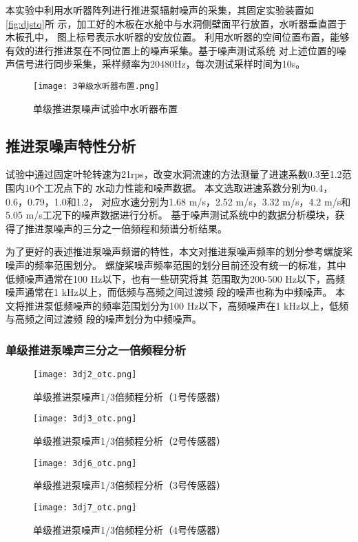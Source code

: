 本实验中利用水听器阵列进行推进泵辐射噪声的采集，其固定实验装置如\autoref{fig:djstq}所
示，加工好的木板在水舱中与水洞侧壁面平行放置，水听器垂直置于木板孔中，
图上标号表示水听器的安放位置。
利用水听器的空间位置布置，能够有效的进行推进泵在不同位置上的噪声采集。基于噪声测试系统
对上述位置的噪声信号进行同步采集，采样频率为20480Hz，每次测试采样时间为10s。
\begin{figure}[htbp]
    \centering
    \texttt{[image: 3单级水听器布置.png]}
    \caption{\label{fig:djstq}单级推进泵噪声试验中水听器布置}
\end{figure}
\subsection{推进泵噪声特性分析}
试验中通过固定叶轮转速为21rps，改变水洞流速的方法测量了进速系数0.3至1.2范围内10个工况点下的
水动力性能和噪声数据。
本文选取进速系数分别为0.4，0.6，0.79，1.0和1.2，
对应水速分别为1.68 m/s，2.52 m/s，3.32 m/s，4.2 m/s和5.05 m/s工况下的噪声数据进行分析。
基于噪声测试系统中的数据分析模块，获得了推进泵噪声的三分之一倍频程和频谱分析结果。

为了更好的表述推进泵噪声频谱的特性，本文对推进泵噪声频率的划分参考螺旋桨噪声的频率范围划分。
螺旋桨噪声频率范围的划分目前还没有统一的标准，其中
低频噪声通常在100 Hz以下，也有一些研究将其
范围取为200-500 Hz以下，高频噪声通常在1 kHz以上，而低频与高频之间过渡频
段的噪声也称为中频噪声\cite{xuye2019a}。
本文将推进泵低频噪声的频率范围划分为100 Hz以下，高频噪声在1 kHz以上，低频与高频之间过渡频
段的噪声划分为中频噪声。
\subsubsection{单级推进泵噪声三分之一倍频程分析}
\begin{figure}[htbp]
    \centering
    \texttt{[image: 3dj2\_otc.png]}
    \caption{\label{fig:djotc1}单级推进泵噪声1/3倍频程分析（1号传感器）}
\end{figure}
\begin{figure}[htbp]
    \centering
    \texttt{[image: 3dj3\_otc.png]}
    \caption{\label{fig:djotc2}单级推进泵噪声1/3倍频程分析（2号传感器）}
\end{figure}
\begin{figure}[htbp]
    \centering
    \texttt{[image: 3dj6\_otc.png]}
    \caption{\label{fig:djotc3}单级推进泵噪声1/3倍频程分析（3号传感器）}
\end{figure}
\begin{figure}[htbp]
    \centering
    \texttt{[image: 3dj7\_otc.png]}
    \caption{\label{fig:djotc4}单级推进泵噪声1/3倍频程分析（4号传感器）}
\end{figure}

